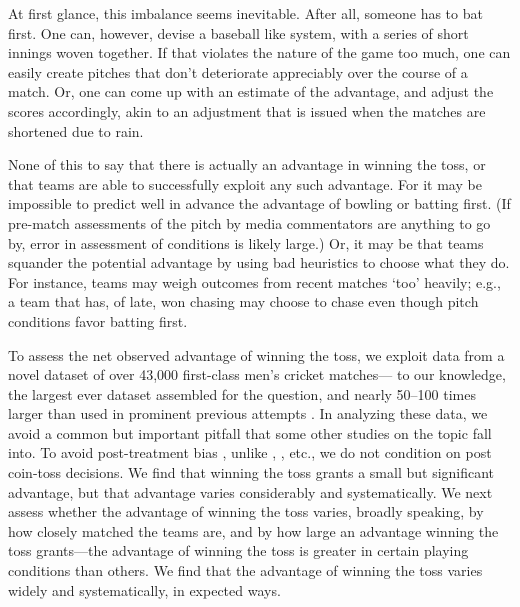 \documentclass[12pt]{article}
\begin{document}
At first glance, this imbalance seems inevitable. After all, someone has to bat first. One can, however, devise a baseball like system, with a series of short innings woven together. If that violates the nature of the game too much, one can easily create pitches that don't deteriorate appreciably over the course of a match. Or, one can come up with an estimate of the advantage, and adjust the scores accordingly, akin to an adjustment that is issued when the matches are shortened due to rain.

None of this to say that there is actually an advantage in winning the toss, or that teams are able to successfully exploit any such advantage. For it may be impossible to predict well in advance the advantage of bowling or batting first. (If pre-match assessments of the pitch by media commentators are anything to go by, error in assessment of conditions is likely large.) Or, it may be that teams squander the potential advantage by using bad heuristics to choose what they do. For instance, teams may weigh outcomes from recent matches `too' heavily; e.g., a team that has, of late, won chasing may choose to chase even though pitch conditions favor batting first.

To assess the net observed advantage of winning the toss, we exploit data from a novel dataset of over 43,000 first-class men's cricket matches--- to our knowledge, the largest ever dataset assembled for the question, and nearly 50--100 times larger than used in prominent previous attempts \citep[see,][]{dawson2009bat, de1998winning}. In analyzing these data, we avoid a common but important pitfall that some other studies on the topic fall into. To avoid post-treatment bias \citep[see][]{acharya2015}, unlike \citet{dawson2009bat}, \citet{Saad2015}, etc., we do not condition on post coin-toss decisions. We find that winning the toss grants a small but significant advantage, but that advantage varies considerably and systematically. We next assess whether the advantage of winning the toss varies, broadly speaking, by how closely matched the teams are, and by how large an advantage winning the toss grants---the advantage of winning the toss is greater in certain playing conditions than others. We find that the advantage of winning the toss varies widely and systematically, in expected ways.
\end{document}
